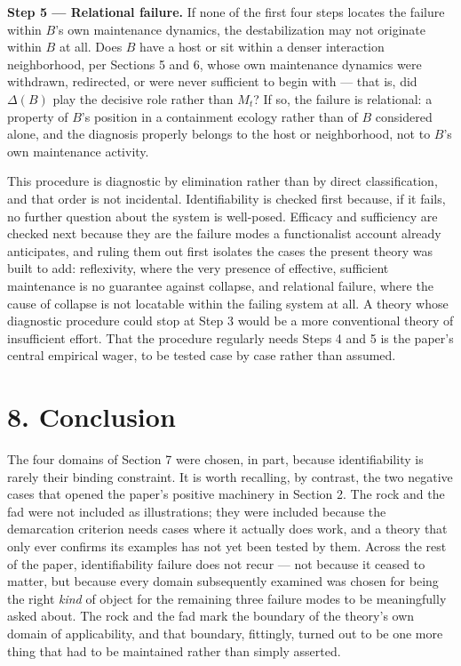 \documentclass[11pt]{article}
\theoremstyle{plain}
\begin{document}
\textbf{Step 5 --- Relational failure.} If none of the first four steps locates the failure within \(B\)'s own maintenance dynamics, the destabilization may not originate within \(B\) at all. Does \(B\) have a host or sit within a denser interaction neighborhood, per Sections 5 and 6, whose own maintenance dynamics were withdrawn, redirected, or were never sufficient to begin with --- that is, did \(\Delta(B)\) play the decisive role rather than \(M_t\)? If so, the failure is relational: a property of \(B\)'s position in a containment ecology rather than of \(B\) considered alone, and the diagnosis properly belongs to the host or neighborhood, not to \(B\)'s own maintenance activity.

This procedure is diagnostic by elimination rather than by direct classification, and that order is not incidental. Identifiability is checked first because, if it fails, no further question about the system is well-posed. Efficacy and sufficiency are checked next because they are the failure modes a functionalist account already anticipates, and ruling them out first isolates the cases the present theory was built to add: reflexivity, where the very presence of effective, sufficient maintenance is no guarantee against collapse, and relational failure, where the cause of collapse is not locatable within the failing system at all. A theory whose diagnostic procedure could stop at Step 3 would be a more conventional theory of insufficient effort. That the procedure regularly needs Steps 4 and 5 is the paper's central empirical wager, to be tested case by case rather than assumed.

\section*{8. Conclusion}

The four domains of Section 7 were chosen, in part, because identifiability is rarely their binding constraint. It is worth recalling, by contrast, the two negative cases that opened the paper's positive machinery in Section 2. The rock and the fad were not included as illustrations; they were included because the demarcation criterion needs cases where it actually does work, and a theory that only ever confirms its examples has not yet been tested by them. Across the rest of the paper, identifiability failure does not recur --- not because it ceased to matter, but because every domain subsequently examined was chosen for being the right \emph{kind} of object for the remaining three failure modes to be meaningfully asked about. The rock and the fad mark the boundary of the theory's own domain of applicability, and that boundary, fittingly, turned out to be one more thing that had to be maintained rather than simply asserted.
\end{document}
